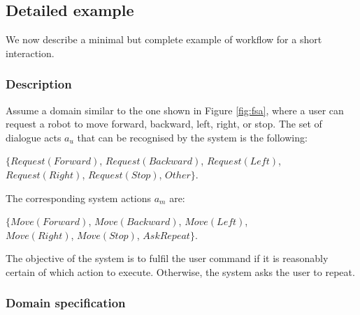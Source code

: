 \subsection{Detailed example}

We now describe a minimal but complete example of workflow for a short interaction. 

\subsubsection*{Description}

Assume a domain similar to the one shown in Figure \ref{fig:fsa}, where a user can request a robot to move forward, backward, left, right, or stop.  The set of dialogue acts $a_u$ that can be recognised by the system is the following: 
\begin{center}
$\{\mathit{Request(Forward)}$, $\mathit{Request(Backward)}$, $\mathit{Request(Left)}$, \\ $\mathit{Request(Right)}$, $\mathit{Request(Stop)}$, $\mathit{Other}\}$. \\
\end{center}
The corresponding system actions $a_m$ are: 
\begin{center}
$\{\mathit{Move(Forward)}$, $\mathit{Move(Backward)}$, $\mathit{Move(Left)}$, \\ $\mathit{Move(Right)}$, $\mathit{Move(Stop)}$, $\mathit{AskRepeat}\}$. 
\end{center}
The objective of the system is to fulfil the user command if it is reasonably certain of which action to execute.  Otherwise, the system asks the user to repeat. 

\subsubsection*{Domain specification}

